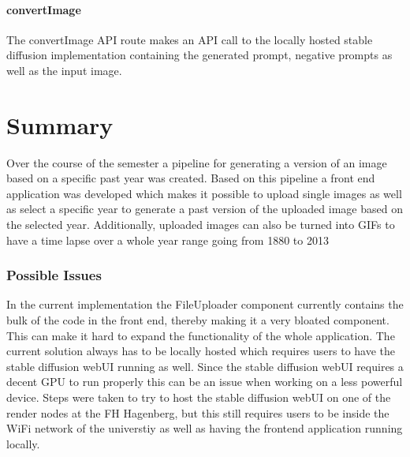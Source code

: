\documentclass[english,notitlepage,smartquotes]{hgbreport}
\begin{document}
\subsubsection{convertImage}
The convertImage API route makes an API call to the locally hosted stable diffusion implementation containing the generated prompt, negative prompts as well as the input image.

\chapter{Summary}

Over the course of the semester a pipeline for generating a version of an image based on a specific past year was created.
Based on this pipeline a front end application was developed which makes it possible to upload single images as well as select a specific year to generate a past version of the uploaded image based on the selected year.
Additionally, uploaded images can also be turned into GIFs to have a time lapse over a whole year range going from 1880 to 2013

\subsection{Possible Issues}
In the current implementation the FileUploader component currently contains the bulk of the code in the front end, thereby making it a very bloated component. This can make it hard to expand the functionality of the whole application. 
The current solution always has to be locally hosted which requires users to have the stable diffusion webUI running as well. Since the stable diffusion webUI requires a decent GPU to run properly this can be an issue when working on a less powerful device. Steps were taken to try to host the stable diffusion webUI on one of the render nodes at the FH Hagenberg, but this still requires users to be inside the WiFi network of the universtiy as well as having the frontend application running locally.


\appendix                                                   %


\MakeBibliography[nosplit]

\end{document}
